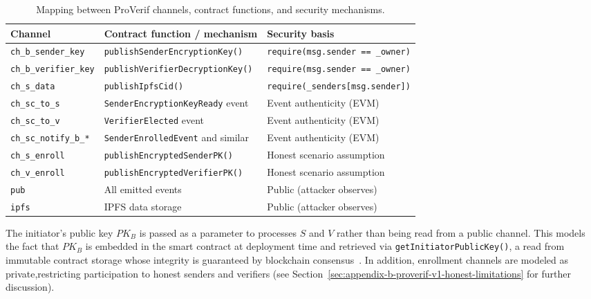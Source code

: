 \begin{table}
    \centering
    \begin{tabular}{lll}
        \hline
        \textbf{Channel} & \textbf{Contract function / mechanism} & \textbf{Security basis} \\
        \hline
        \texttt{ch\_b\_sender\_key}        & \texttt{publishSenderEncryptionKey()}    & \texttt{require(msg.sender == \_owner)} \\
        \texttt{ch\_b\_verifier\_key}      & \texttt{publishVerifierDecryptionKey()}  & \texttt{require(msg.sender == \_owner)} \\
        \texttt{ch\_s\_data}               & \texttt{publishIpfsCid()}                & \texttt{require(\_senders[msg.sender])} \\
        \texttt{ch\_sc\_to\_s}             & \texttt{SenderEncryptionKeyReady} event  & Event authenticity (EVM) \\
        \texttt{ch\_sc\_to\_v}             & \texttt{VerifierElected} event           & Event authenticity (EVM) \\
        \texttt{ch\_sc\_notify\_b\_*}      & \texttt{SenderEnrolledEvent} and similar & Event authenticity (EVM) \\
        \texttt{ch\_s\_enroll}             & \texttt{publishEncryptedSenderPK()}      & Honest scenario assumption \\
        \texttt{ch\_v\_enroll}             & \texttt{publishEncryptedVerifierPK()}    & Honest scenario assumption \\
        \texttt{pub}                       & All emitted events                       & Public (attacker observes) \\
        \texttt{ipfs}                      & IPFS data storage                        & Public (attacker observes) \\
        \hline
    \end{tabular}
    \caption{Mapping between ProVerif channels, contract functions, and security mechanisms.}
    \label{tab:appendix-b-proverif-channels}
\end{table}

The initiator's public key $PK_B$ is passed as a parameter to processes $S$ and $V$ rather than being read from a public channel.
This models the fact that $PK_B$ is embedded in the smart contract at deployment time and retrieved via \texttt{getInitiatorPublicKey()}, a read from immutable contract storage whose integrity is guaranteed by blockchain consensus~\cite{bitcoin, ethereum}.
In addition, enrollment channels are modeled as private,restricting participation to honest senders and verifiers (see Section~\ref{sec:appendix-b-proverif-v1-honest-limitations} for further discussion).

